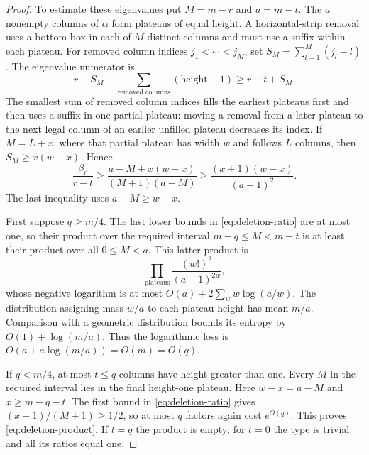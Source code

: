 \begin{proof}
To estimate these eigenvalues put $M=m-r$ and $a=m-t$. The $a$ nonempty columns of $\alpha$ form plateaus of equal height. A horizontal-strip removal uses a bottom box in each of $M$ distinct columns and must use a suffix within each plateau. For removed column indices $j_1<\cdots<j_M$, set $S_M=\sum_{l=1}^M(j_l-l)$. The eigenvalue numerator is
\[
 r+S_M-\sum_{\text{removed columns}}(\text{height}-1)
 \ge r-t+S_M.
\]
The smallest sum of removed column indices fills the earliest plateaus first and then uses a suffix in one partial plateau: moving a removal from a later plateau to the next legal column of an earlier unfilled plateau decreases its index. If $M=L+x$, where that partial plateau has width $w$ and follows $L$ columns, then $S_M\ge x(w-x)$. Hence
\begin{equation}\label{eq:deletion-ratio}
 \frac{\beta_r}{r-t}
 \ge\frac{a-M+x(w-x)}{(M+1)(a-M)}
 \ge\frac{(x+1)(w-x)}{(a+1)^2}.
\end{equation}
The last inequality uses $a-M\ge w-x$.

First suppose $q\ge m/4$. The last lower bounds in \eqref{eq:deletion-ratio} are at most one, so their product over the required interval $m-q\le M<m-t$ is at least their product over all $0\le M<a$. This latter product is
\[
 \prod_{\text{plateaus}}\frac{(w!)^2}{(a+1)^{2w}},
\]
whose negative logarithm is at most $O(a)+2\sum_w w\log(a/w)$. The distribution assigning mass $w/a$ to each plateau height has mean $m/a$. Comparison with a geometric distribution bounds its entropy by $O(1)+\log(m/a)$. Thus the logarithmic loss is $O(a+a\log(m/a))=O(m)=O(q)$.

If $q<m/4$, at most $t\le q$ columns have height greater than one. Every $M$ in the required interval lies in the final height-one plateau. Here $w-x=a-M$ and $x\ge m-q-t$. The first bound in \eqref{eq:deletion-ratio} gives $(x+1)/(M+1)\ge1/2$, so at most $q$ factors again cost $e^{O(q)}$. This proves \eqref{eq:deletion-product}. If $t=q$ the product is empty; for $t=0$ the type is trivial and all its ratios equal one.
\end{proof}

